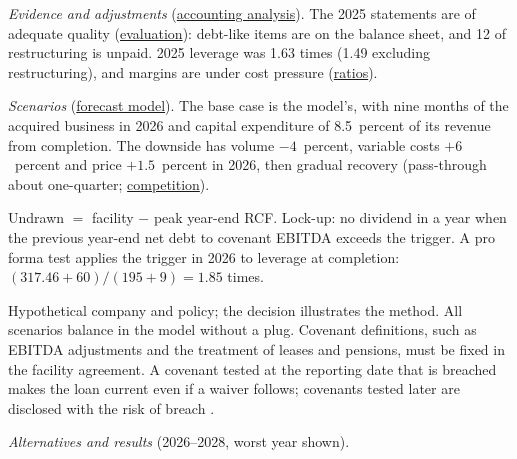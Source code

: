 \begin{qfexample}
\emph{Evidence and adjustments} (\hyperref[meth:accounting-analysis-adjustments]{accounting analysis}). The 2025 statements are of adequate quality (\hyperref[meth:cash-flow-balance-sheet-quality]{evaluation}): debt-like items are on the balance sheet, and 12 of restructuring is unpaid. 2025 leverage was 1.63 times (1.49 excluding restructuring), and margins are under cost pressure (\hyperref[meth:ratio-based-evaluation]{ratios}).

\emph{Scenarios} (\hyperref[ex:harbour-pro-forma-model]{forecast model}). The base case is the model's, with nine months of the acquired business in 2026 and capital expenditure of 8.5~percent of its revenue from completion. The downside has volume $-4$~percent, variable costs $+6$~percent and price $+1.5$~percent in 2026, then gradual recovery (pass-through about one-quarter; \hyperref[meth:competition-inflation-forecasting]{competition}).

 Undrawn $=$ facility $-$ peak year-end RCF. Lock-up: no dividend in a year when the previous year-end net debt to covenant EBITDA exceeds the trigger. A pro forma test applies the trigger in 2026 to leverage at completion: $(317.46+60)/(195+9)=1.85$ times.

 Hypothetical company and policy; the decision illustrates the method. All scenarios balance in the model without a plug. Covenant definitions, such as EBITDA adjustments and the treatment of leases and pensions, must be fixed in the facility agreement. A covenant tested at the reporting date that is breached makes the loan current even if a waiver follows; covenants tested later are disclosed with the risk of breach \citep[Annex, IAS~1 paras.~72B, 74 and~76ZA]{eu-2023-2822-ias1}.

 \emph{Alternatives and results} (2026--2028, worst year shown).


\end{qfexample}
